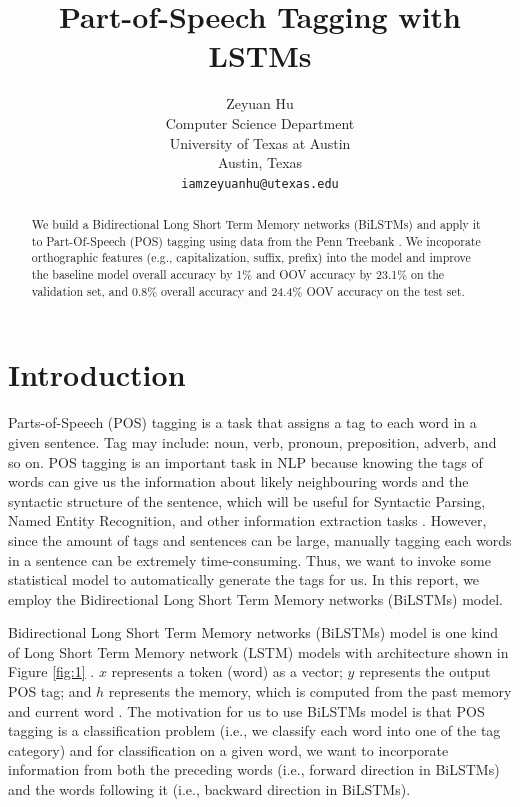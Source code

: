 \documentclass[11pt,letterpaper]{article}
\title{Part-of-Speech Tagging with LSTMs}
\author{Zeyuan Hu \\
  Computer Science Department \\
  University of Texas at Austin \\
  Austin, Texas \\
  {\tt iamzeyuanhu@utexas.edu} \\
}
\date{}
\begin{document}
\maketitle

\begin{abstract}
	We build a Bidirectional Long Short Term Memory networks (BiLSTMs) and apply it 
	to Part-Of-Speech (POS) tagging using data from the Penn Treebank \cite{Marcus:1994}.
	We incoporate orthographic features (e.g., capitalization, suffix, prefix) into the model
	and improve the baseline model overall accuracy by 1\% and OOV accuracy by 23.1\% on the validation set, 
	and 0.8\% overall accuracy and 24.4\% OOV accuracy on the test set.
\end{abstract}

\section{Introduction}

Parts-of-Speech (POS) tagging is a task that assigns a tag to each word in a given sentence.
Tag may include: noun, verb, pronoun, preposition, adverb, and so on. 
POS tagging is an important task in NLP because knowing the tags of words can
give us the information about likely neighbouring words 
and the syntactic structure of the sentence,
which will be useful for Syntactic Parsing, Named Entity Recognition, and other 
information extraction tasks \cite[Chapter~10]{Jurafsky:2017}. However, since the amount
of tags and sentences can be large, manually tagging each words in a sentence
can be extremely time-consuming. Thus, we want to invoke some statistical model
to automatically generate the tags for us. In this report, we employ
the Bidirectional Long Short Term Memory networks (BiLSTMs) model.

Bidirectional Long Short Term Memory networks (BiLSTMs) model is one
kind of Long Short Term Memory network (LSTM) models with architecture shown in
Figure \ref{fig:1} \cite{cs224d}. $x$ represents a token (word) as a vector;
$y$ represents the output POS tag; and $h$ represents the memory, which is
computed from the past memory and current word \cite{colah}. The motivation
for us to use BiLSTMs model is that POS tagging is a classification problem 
(i.e., we classify each word into one of the tag category) and for classification
on a given word, we want to incorporate information from both the preceding
words (i.e., forward direction in BiLSTMs) and the words following it
(i.e., backward direction in BiLSTMs).
\end{document}
